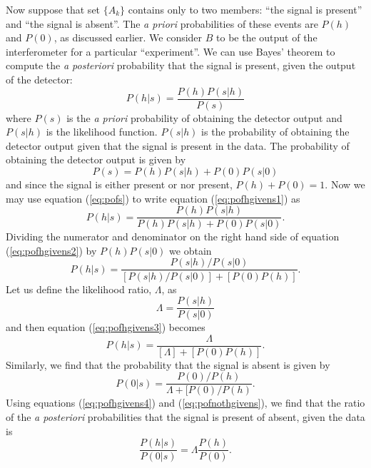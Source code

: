Now suppose that set $\{A_k\}$ contains only to two members: ``the signal is
present'' and ``the signal is absent''. The \emph{a priori} probabilities of
these events are $P(h)$ and $P(0)$, as discussed earlier. We consider $B$ to
be the output of the interferometer for a particular ``experiment''. We can
use Bayes' theorem to compute the \emph{a posteriori} probability that the
signal is present, given the output of the detector:
\begin{equation}
P(h|s) = \frac{P(h)P(s|h)}{P(s)}
\label{eq:pofhgivens1}
\end{equation}
where $P(s)$ is the \emph{a priori} probability of obtaining the detector
output and $P(s|h)$ is the likelihood function. $P(s|h)$ is the probability of
obtaining the detector output given that the signal is present in the data.
The probability of obtaining the detector output is given by
\begin{equation}
P(s) = P(h)P(s|h) + P(0)P(s|0)
\label{eq:pofs}
\end{equation}
and since the signal is either present or nor present, $P(h) + P(0) = 1$. Now
we may use equation (\ref{eq:pofs}) to write equation (\ref{eq:pofhgivens1})
as
\begin{equation}
P(h|s) = \frac{P(h)P(s|h)}{P(h)P(s|h) + P(0)P(s|0)}.
\label{eq:pofhgivens2}
\end{equation}
Dividing the numerator and denominator on the right hand side of equation
(\ref{eq:pofhgivens2}) by $P(h)P(s|0)$ we obtain
\begin{equation}
P(h|s) = \frac{P(s|h)/P(s|0)}{[P(s|h)/P(s|0)] + [P(0)P(h)]}.
\label{eq:pofhgivens3}
\end{equation}
Let us define the likelihood ratio, $\Lambda$, as
\begin{equation}
\Lambda = \frac{P(s|h)}{P(s|0)}
\label{eq:likelihooddef}
\end{equation}
and then equation (\ref{eq:pofhgivens3}) becomes
\begin{equation}
P(h|s) = \frac{\Lambda}{[\Lambda] + [P(0)P(h)]}.
\label{eq:pofhgivens4}
\end{equation}
Similarly, we find that the probability that the signal is absent is given by
\begin{equation}
P(0|s) = \frac{P(0)/P(h)}{\Lambda + [P(0)/P(h)}.
\label{eq:pofnothgivens}
\end{equation}
Using equations (\ref{eq:pofhgivens4}) and (\ref{eq:pofnothgivens}), we find
that the ratio of the \emph{a posteriori} probabilities that the signal is
present of absent, given the data is
\begin{equation}
\frac{P(h|s)}{P(0|s)} = \Lambda\frac{P(h)}{P(0)}.
\label{eq:postratio}
\end{equation}

